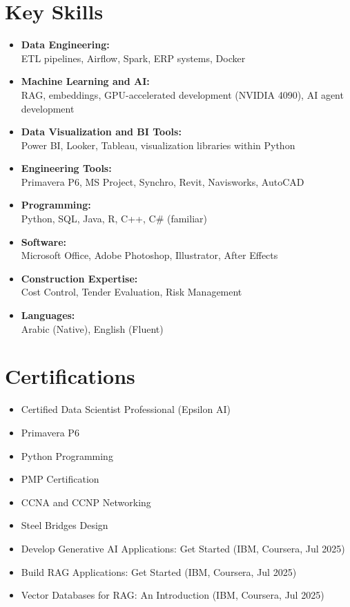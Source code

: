 \documentclass[10pt, letterpaper]{article}
\begin{document}
\section{Key Skills}
\vspace{-1.5ex}
\begin{itemize}[leftmargin=*, itemsep=0.5ex]
    \item \textbf{Data Engineering:} \\
    ETL pipelines, Airflow, Spark, ERP systems, Docker
    \item \textbf{Machine Learning and AI:} \\
    RAG, embeddings, GPU-accelerated development (NVIDIA 4090), AI agent development
    \item \textbf{Data Visualization and BI Tools:} \\
    Power BI, Looker, Tableau, visualization libraries within Python
    \item \textbf{Engineering Tools:} \\
    Primavera P6, MS Project, Synchro, Revit, Navisworks, AutoCAD
    \item \textbf{Programming:} \\
    Python, SQL, Java, R, C++, C\# (familiar)
    \item \textbf{Software:} \\
    Microsoft Office, Adobe Photoshop, Illustrator, After Effects
    \item \textbf{Construction Expertise:} \\
    Cost Control, Tender Evaluation, Risk Management
    \item \textbf{Languages:} \\
    Arabic (Native), English (Fluent)
\end{itemize}

\newpage
\section{Certifications}
\vspace{-1ex}
\begin{itemize}[leftmargin=*, itemsep=0.5ex]
    \item Certified Data Scientist Professional (Epsilon AI)
    \item Primavera P6
    \item Python Programming
    \item PMP Certification
    \item CCNA and CCNP Networking
    \item Steel Bridges Design
    \item Develop Generative AI Applications: Get Started (IBM, Coursera, Jul 2025)
    \item Build RAG Applications: Get Started (IBM, Coursera, Jul 2025)
    \item Vector Databases for RAG: An Introduction (IBM, Coursera, Jul 2025)
\end{itemize}
\end{document}

